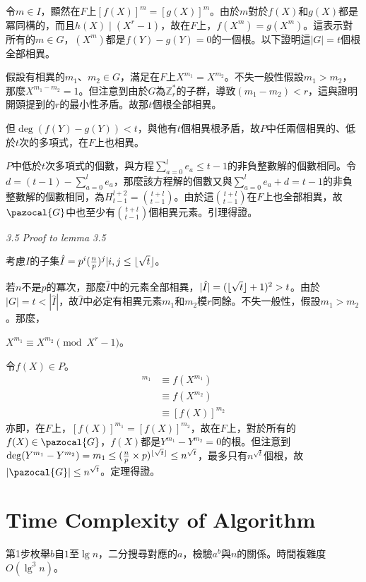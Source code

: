 \documentclass{article}
\DeclarePairedDelimiter\floor{\lfloor}{\rfloor}
\newcommand{\Ih}{\hat{I}}
\newcommand{\Gc}{\pazocal{G}}
\begin{document}
    令$m\in I$，顯然在$F$上$[f(X)]^m=[g(X)]^m$。由於$m$對於$f(X)$和$g(X)$都是冪同構的，而且$h(X)\mid (X^r-1)$，故在$F$上，$f(X^m)=g(X^m)$。這表示對所有的$m\in G$，$(X^m)$都是$f(Y)-g(Y)=0$的一個根。以下證明這$|G|=t$個根全部相異。
    
    假設有相異的$m_1$、$m_2\in G$，滿足在$F$上$X^{m_1}=X^{m_2}$。不失一般性假設$m_1>m_2$，那麼$X^{m_1-m_2}=1$。但注意到由於$G$為$\mathbb{Z}_r^*$的子群，導致$(m_1-m_2)<r$，這與證明開頭提到的$r$的最小性矛盾。故那$t$個根全部相異。

    但$\deg(f(Y)-g(Y))<t$，與他有$t$個相異根矛盾，故$P$中任兩個相異的、低於$t$次的多項式，在$F$上也相異。

    $P$中低於$t$次多項式的個數，與方程$\sum\limits_{a=0}^{l}e_a\leq t-1$的非負整數解的個數相同。令$d=(t-1)-\sum\limits_{a=0}^{l}e_a$，那麼該方程解的個數又與$\sum\limits_{a=0}^{l}e_a+d=t-1$的非負整數解的個數相同，為$H_{t-1}^{l+2}=\binom{t+l}{t-1}$。由於這$\binom{t+l}{t-1}$在$F$上也全部相異，故$\Gc$中也至少有$\binom{t+l}{t-1}$個相異元素。引理得證。

\noindent\textit{3.5 Proof to lemma 3.5}

    考慮$I$的子集$\Ih={p^i(\frac{n}{p})^j|i,j\leq\floor{\sqrt{t}}}$。
    
    若$n$不是$p$的冪次，那麼$\Ih$中的元素全部相異，$|\Ih|=(\floor{\sqrt{t}}+1)^2>t$。由於$|G|=t<|\Ih|$，故$\Ih$中必定有相異元素$m_1$和$m_2$模$r$同餘。不失一般性，假設$m_1>m_2$。那麼，\\
    \centerline{$X^{m_1}\equiv X^{m_2}\pmod{X^r-1}$。}

    令$f(X)\in P$。
    \begin{align*}
    [f(X)]^{m_1}&\equiv f(X^{m_1})\\
                &\equiv f(X^{m_2})\\
                &\equiv [f(X)]^{m_2}
    \end{align*}
    亦即，在$F$上，$[f(X)]^{m_1}=[f(X)]^{m_2}$，故在$F$上，對於所有的$f(X)\in\Gc$，$f(X)$都是$Y^{m_1}-Y^{m_2}=0$的根。但注意到$\deg(Y^{m_1}-Y^{m_2})=m_1\leq(\frac{n}{p}\times p)^{\floor{\sqrt{t}}}\leq n^{\sqrt{t}}$，最多只有$n^{\sqrt{t}}$個根，故$|\Gc|\leq n^{\sqrt{t}}$。定理得證。

\section{Time Complexity of Algorithm}

    第1步枚舉$b$自$1$至$\lg n$，二分搜尋對應的$a$，檢驗$a^b$與$n$的關係。時間複雜度$O(\lg^3n)$。
\end{document}
